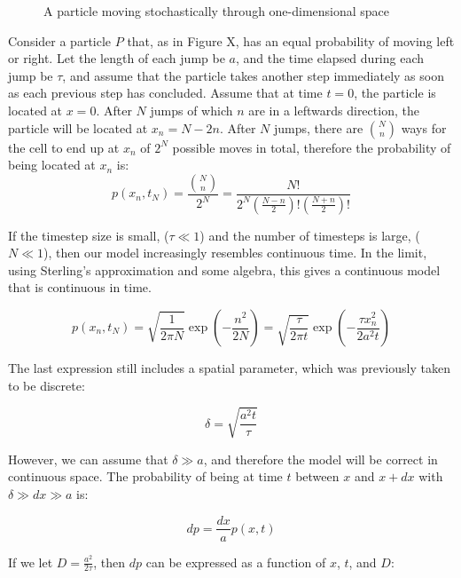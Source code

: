 \documentclass[12pt]{article}
\begin{document}
\begin{figure}[H]
\centering
\caption[]{A particle moving stochastically through 
one-dimensional space}
\end{figure}

Consider a particle \(P\) that, as in Figure X, has an equal probability of 
moving left or right. Let the length of each jump be \(a\), and 
the time elapsed during each jump be \(\tau\), and assume that 
the particle takes another step immediately as soon as each previous 
step has concluded. Assume that at time 
\(t=0\), the particle is located at \(x=0\). After \(N\) jumps of which \(n\) are in a 
leftwards direction, the particle will be located at \(x_n = N-2n\). 
After \(N\) jumps, there are \(\binom{N}{n}\) ways 
for the cell to end up at \(x_n\) of \(2^N\) possible moves in 
total, therefore the probability of being located at \(x_n\) is:
\begin{equation} 
  p(x_n,t_N) = \frac{\binom{N}{n}}{2^N} = \frac{N!}{2^N(\frac{N-n}{2})!(\frac{N+n}{2})!}
\end{equation}

If the timestep size is small, (\(\tau \ll 1\)) and the number of timesteps is large, 
(\(N \ll 1\)), then our model increasingly resembles continuous time. 
In the limit, using Sterling's approximation 
and some algebra, this gives a continuous model that is continuous in 
time.

\begin{equation}
  p(x_n,t_N) = \sqrt{\frac{1}{2\pi N}}\exp(-\frac{n^2}{2N}) = \sqrt{\frac{\tau}{2\pi t}}\exp(-\frac{\tau x^2_n}{2a^2t})
\end{equation}

The last expression still includes a spatial parameter, which was 
previously taken to be discrete: 

\begin{equation}
  \delta = \sqrt{\frac{a^2t}{\tau}}
\end{equation}

However, we can assume that \(\delta \gg a\), and therefore the 
model will be correct in continuous space. The probability of being at 
time \(t\) between \(x\) and \(x+dx\) with \(\delta \gg dx \gg a\) is:

\begin{equation}
  dp = \frac{dx}{a}p(x,t)
\end{equation}

If we let \(D = \frac{a^2}{2\tau}\), then \(dp\) can be expressed as a 
function of \(x\), \(t\), and \(D\):
\end{document}

